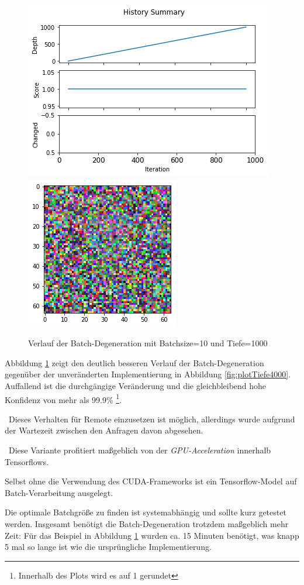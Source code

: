 \begin{figure}[h]
	\centering
	\includegraphics[width=0.5\linewidth]{Images/DegenSamples/BatchDegPlotTiefe1000}
	\includegraphics[width=0.35\linewidth]{Images/DegenSamples/BatchDegTiefe1000}
	\caption[Batch-Degeneration-Plot]{Verlauf der Batch-Degeneration mit Batchsize=10 und Tiefe=1000}
	\label{fig:batchdegplottiefe1000}
\end{figure}

Abbildung \ref{fig:batchdegplottiefe1000} zeigt den deutlich besseren Verlauf der Batch-Degeneration gegenüber der unveränderten Implementierung in Abbildung \ref{fig:plotTiefe4000}. Auffallend ist die durchgängige Veränderung und die gleichbleibend hohe Konfidenz von mehr als 99.9\% \footnote{Innerhalb des Plots wird es auf 1 gerundet}. 

~\newline Dieses Verhalten für Remote einzusetzen ist möglich, allerdings wurde aufgrund der Wartezeit zwischen den Anfragen davon abgesehen. 

~\newline Diese Variante profitiert maßgeblich von der \textit{GPU-Acceleration} innerhalb Tensorflows. 

Selbst ohne die Verwendung des CUDA-Frameworks ist ein Tensorflow-Model auf Batch-Verarbeitung ausgelegt. 

Die optimale Batchgröße zu finden ist systemabhängig und sollte kurz getestet werden. Insgesamt benötigt die Batch-Degeneration trotzdem maßgeblich mehr Zeit: Für das Beispiel in Abbildung \ref{fig:batchdegplottiefe1000} wurden ca. 15 Minuten benötigt, was knapp 5 mal so lange ist wie die ursprüngliche Implementierung. 

